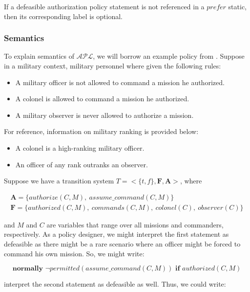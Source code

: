 If a defeasible authorization policy statement is not referenced in a $prefer$ static, then its corresponding label is optional.

\subsubsection{Semantics}

To explain semantics of $\mathcal{APL}$, we will borrow an example policy from \citet{gelfond_authorization_2008}.
Suppose in a military context, military personnel where given the following rules:

\begin{itemize}
    \item A military officer is not allowed to command a mission he authorized.
    \item A colonel is allowed to command a mission he authorized.
    \item A military observer is never allowed to authorize a mission.
\end{itemize}

For reference, information on military ranking is provided below:

\begin{itemize}
    \item A colonel is a high-ranking military officer.
    \item An officer of any rank outranks an observer.
\end{itemize}

Suppose we have a transition system $T=<\{t,f\},\boldsymbol{F},\boldsymbol{A}>$, where

\begin{gather*}
    \boldsymbol{A}=\{authorize(C,M),\ assume\_command(C, M)\} \\
    \boldsymbol{F}=\{authorized(C,M),\ commands(C,M),\ colonel(C),\ observer(C)\}
\end{gather*}

\noindent
and $M$ and $C$ are variables that range over all missions and commanders, respectively.
As a policy designer, we might interpret the first statement as defeasible as there might be a rare scenario where an officer might be forced to command his own mission.
So, we might write:

\[
\textbf{normally } \neg permitted(assume\_command(C, M)) \textbf{ if } authorized(C, M)
\]

\citet{gelfond_authorization_2008} interpret the second statement as defeasible as well.
Thus, we could write:

